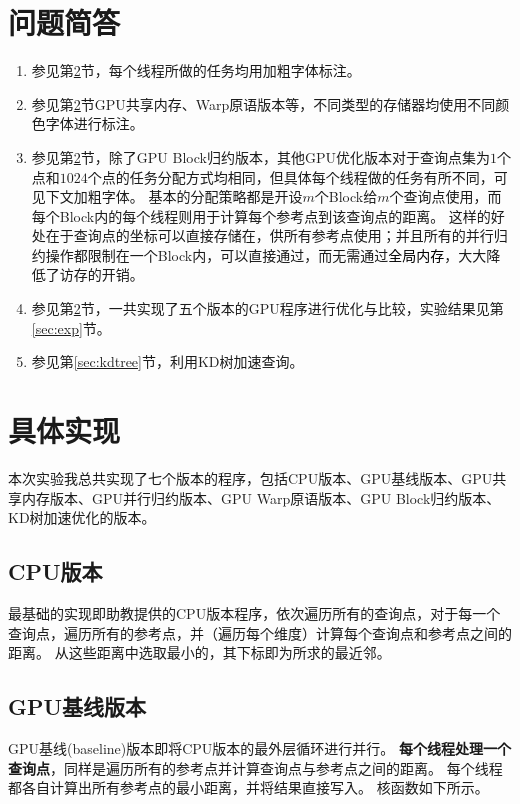\documentclass[logo,reportComp]{thesis}
\def\globalmem{\textcolor{black}{\kaiti 全局内存}}
\def\sharedmem{\textcolor{red}{\kaiti 共享内存}}
\begin{document}
\section{问题简答}
\begin{enumerate}
	\item 参见第\ref{sec:imp}节，每个线程所做的任务均用加粗字体标注。
	\item 参见第\ref{sec:imp}节GPU共享内存、Warp原语版本等，不同类型的存储器均使用不同颜色字体进行标注。
	\item 参见第\ref{sec:imp}节，除了GPU Block归约版本，其他GPU优化版本对于查询点集为$1$个点和$1024$个点的任务分配方式均相同，但具体每个线程做的任务有所不同，可见下文加粗字体。
	基本的分配策略都是开设$m$个Block给$m$个查询点使用，而每个Block内的每个线程则用于计算每个参考点到该查询点的距离。
	这样的好处在于查询点的坐标可以直接存储在，供所有参考点使用；并且所有的并行归约操作都限制在一个Block内，可以直接通过，而无需通过\globalmem，大大降低了访存的开销。
	\item 参见第\ref{sec:imp}节，一共实现了五个版本的GPU程序进行优化与比较，实验结果见第\ref{sec:exp}节。
	\item 参见第\ref{sec:kdtree}节，利用KD树加速查询。
\end{enumerate}

\section{具体实现}
\label{sec:imp}
本次实验我总共实现了七个版本的程序，包括CPU版本、GPU基线版本、GPU共享内存版本、GPU并行归约版本、GPU Warp原语版本、GPU Block归约版本、KD树加速优化的版本。

\subsection{CPU版本}
最基础的实现即助教提供的CPU版本程序，依次遍历所有的查询点，对于每一个查询点，遍历所有的参考点，并（遍历每个维度）计算每个查询点和参考点之间的距离。
从这些距离中选取最小的，其下标即为所求的最近邻。



\subsection{GPU基线版本}
GPU基线(baseline)版本即将CPU版本的最外层循环进行并行。
\textbf{每个线程处理一个查询点}，同样是遍历所有的参考点并计算查询点与参考点之间的距离。
每个线程都各自计算出所有参考点的最小距离，并将结果直接写入。
核函数如下所示。

\end{document}
